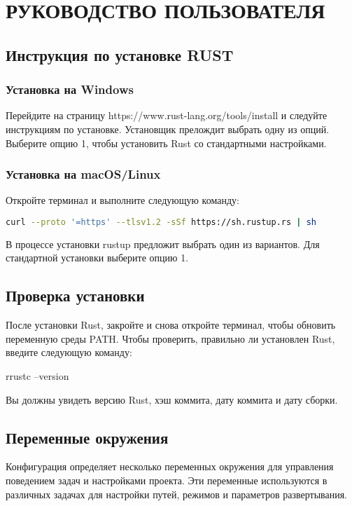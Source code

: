 \section{РУКОВОДСТВО ПОЛЬЗОВАТЕЛЯ}

\subsection{ Инструкция по установке RUST }
\subsubsection{ Установка на Windows }
    Перейдите на страницу https://www.rust-lang.org/tools/install и следуйте инструкциям по установке.
    Установщик прелождит выбрать одну из опций. Выберите опцию 1, чтобы установить Rust со стандартными настройками.

\subsubsection{Установка на macOS/Linux}
Откройте терминал и выполните следующую команду:

\begin{lstlisting}[language=bash]
curl --proto '=https' --tlsv1.2 -sSf https://sh.rustup.rs | sh
\end{lstlisting}


В процессе установки rustup предложит выбрать один из вариантов. Для стандартной установки выберите опцию 1.

\subsection{Проверка установки}
	После установки Rust, закройте и снова откройте терминал, чтобы обновить переменную среды PATH.
	Чтобы проверить, правильно ли установлен Rust, введите следующую команду:
\begin{lstinline}[language=bash]
rrustc --version
\end{lstinline}


Вы должны увидеть версию Rust, хэш коммита, дату коммита и дату сборки.

\subsection{Переменные окружения}

Конфигурация определяет несколько переменных окружения для управления поведением задач и настройками проекта. Эти переменные используются в различных задачах для настройки путей, режимов и параметров развертывания.

